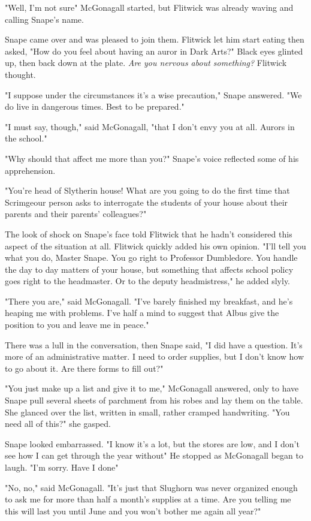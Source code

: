 "Well, I'm not sure{\el}" McGonagall started, but Flitwick was already waving and calling Snape's name.

Snape came over and was pleased to join them. Flitwick let him start eating then asked, "How do you feel about having an auror in Dark Arts?" Black eyes glinted up, then back down at the plate. \emph{Are you nervous about something?} Flitwick thought.

"I suppose under the circumstances it's a wise precaution," Snape answered. "We do live in dangerous times. Best to be prepared."

"I must say, though," said McGonagall, "that I don't envy you at all. Aurors in the school."

"Why should that affect me more than you?" Snape's voice reflected some of his apprehension.

"You're head of Slytherin house! What are you going to do the first time that Scrimgeour person asks to interrogate the students of your house about their parents and their parents' colleagues?"

The look of shock on Snape's face told Flitwick that he hadn't considered this aspect of the situation at all. Flitwick quickly added his own opinion. "I'll tell you what you do, Master Snape. You go right to Professor Dumbledore. You handle the day to day matters of your house, but something that affects school policy goes right to the headmaster. Or to the deputy headmistress," he added slyly.

"There you are," said McGonagall. "I've barely finished my breakfast, and he's heaping me with problems. I've half a mind to suggest that Albus give the position to you and leave me in peace."

There was a lull in the conversation, then Snape said, "I did have a question. It's more of an administrative matter. I need to order supplies, but I don't know how to go about it. Are there forms to fill out?"

"You just make up a list and give it to me," McGonagall answered, only to have Snape pull several sheets of parchment from his robes and lay them on the table. She glanced over the list, written in small, rather cramped handwriting. "You need all of this?" she gasped.

Snape looked embarrassed. "I know it's a lot, but the stores are low, and I don't see how I can get through the year without{\el}" He stopped as McGonagall began to laugh. "I'm sorry. Have I done{\el}"

"No, no," said McGonagall. "It's just that Slughorn was never organized enough to ask me for more than half a month's supplies at a time. Are you telling me this will last you until June and you won't bother me again all year?"

